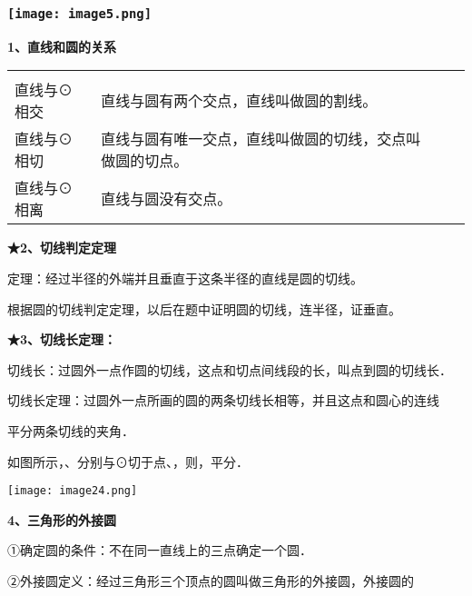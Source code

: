 \hypertarget{ux5b66ux79d1ux7f51www.zxxk.com--ux6559ux80b2ux8d44ux6e90ux95e8ux6237ux63d0ux4f9bux8bd5ux9898ux8bd5ux5377ux6559ux6848ux8bfeux4ef6ux6559ux5b66ux8bbaux6587ux7d20ux6750ux7b49ux5404ux7c7bux6559ux5b66ux8d44ux6e90ux5e93ux4e0bux8f7dux8fd8ux6709ux5927ux91cfux4e30ux5bccux7684ux6559ux5b66ux8d44ux8baf-19}{%
\subsubsection{\texorpdfstring{\protect\texttt{[image: image5.png]}}{学科网(www.zxxk.com)-\/-教育资源门户，提供试题试卷、教案、课件、教学论文、素材等各类教学资源库下载，还有大量丰富的教学资讯！}}\label{ux5b66ux79d1ux7f51www.zxxk.com--ux6559ux80b2ux8d44ux6e90ux95e8ux6237ux63d0ux4f9bux8bd5ux9898ux8bd5ux5377ux6559ux6848ux8bfeux4ef6ux6559ux5b66ux8bbaux6587ux7d20ux6750ux7b49ux5404ux7c7bux6559ux5b66ux8d44ux6e90ux5e93ux4e0bux8f7dux8fd8ux6709ux5927ux91cfux4e30ux5bccux7684ux6559ux5b66ux8d44ux8baf-19}}

\textbf{1、直线和圆的关系}

\begin{longtable}[]{@{}llll@{}}
\toprule
\endhead
& & &\tabularnewline
直线与⊙相交 & 直线与圆有两个交点，直线叫做圆的割线。 & &\tabularnewline
直线与⊙相切 & 直线与圆有唯一交点，直线叫做圆的切线，交点叫做圆的切点。 &
&\tabularnewline
直线与⊙相离 & 直线与圆没有交点。 & &\tabularnewline
\bottomrule
\end{longtable}

\textbf{★2、切线判定定理}

定理：经过半径的外端并且垂直于这条半径的直线是圆的切线。

根据圆的切线判定定理，以后在题中证明圆的切线，连半径，证垂直。

\textbf{★3、切线长定理：}

切线长：过圆外一点作圆的切线，这点和切点间线段的长，叫点到圆的切线长．

切线长定理：过圆外一点所画的圆的两条切线长相等，并且这点和圆心的连线

平分两条切线的夹角．

如图所示，、分别与⊙切于点、，则，平分．

\texttt{[image: image24.png]}

\textbf{4、三角形的外接圆}

①确定圆的条件：不在同一直线上的三点确定一个圆．

②外接圆定义：经过三角形三个顶点的圆叫做三角形的外接圆，外接圆的

